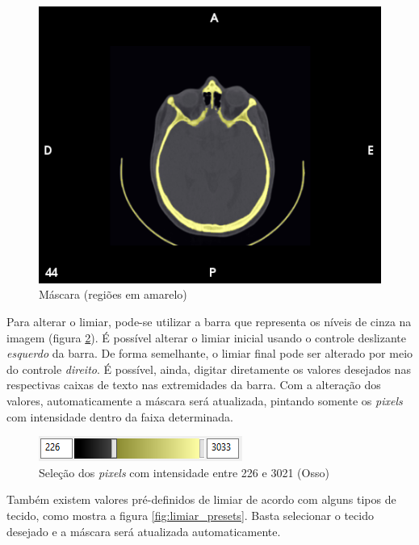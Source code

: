 \begin{figure}[!htb]
\centering
\includegraphics[scale=0.4]{../user_guide_figures/invesalius_screen/segmentation_threshold_axial_pt.png}
\caption{Máscara (regiões em amarelo)}
\label{fig:region_selection_masc}
\end{figure}

Para alterar o limiar, pode-se utilizar a barra que representa os níveis de cinza na imagem (figura
\ref{fig:region_selection_bar}). É possível alterar o limiar inicial usando o controle deslizante
\textit{esquerdo} da barra. De forma semelhante, o limiar final pode ser alterado por meio do controle
\textit{direito}. É possível, ainda, digitar diretamente os valores desejados nas respectivas caixas
de texto nas extremidades da barra. Com a alteração dos valores, automaticamente a máscara será atualizada,
pintando somente os \textit{pixels} com intensidade dentro da faixa determinada.

\begin{figure}[!htb]
\centering
\includegraphics[scale=0.75]{../user_guide_figures/invesalius_screen/segmentation_threshold_bar.png}
\caption{Seleção dos \textit{pixels} com intensidade entre 226 e 3021 (Osso)}
\label{fig:region_selection_bar}
\end{figure}

Também existem valores pré-definidos de limiar de acordo com alguns tipos de tecido, como mostra a
figura \ref{fig:limiar_presets}. Basta selecionar o tecido desejado e a máscara será atualizada
automaticamente.

